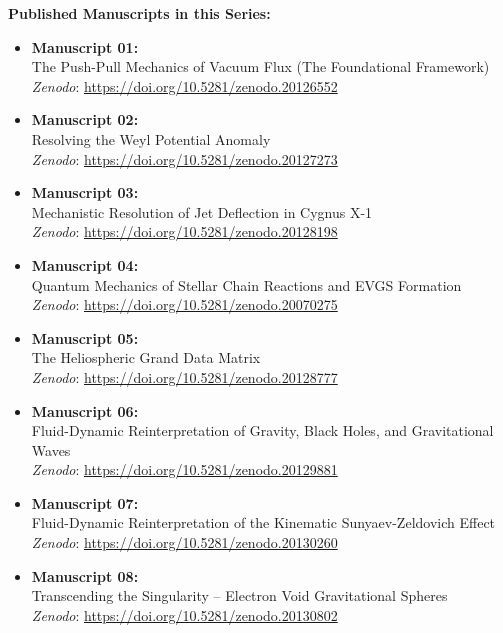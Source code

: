 \documentclass[11pt, a4paper]{article}
\begin{document}
  \vspace{1em}
  \noindent \textbf{Published Manuscripts in this Series:}
  \begin{itemize}
    \item \textbf{Manuscript 01:} \\ The Push-Pull Mechanics of Vacuum Flux (The Foundational Framework) \\ \textit{Zenodo}: \url{https://doi.org/10.5281/zenodo.20126552}
    
    \item \textbf{Manuscript 02:} \\ Resolving the Weyl Potential Anomaly \\ \textit{Zenodo}: \url{https://doi.org/10.5281/zenodo.20127273}

    \item \textbf{Manuscript 03:} \\ Mechanistic Resolution of Jet Deflection in Cygnus X-1 \\ \textit{Zenodo}: \url{https://doi.org/10.5281/zenodo.20128198}

    \item \textbf{Manuscript 04:} \\ Quantum Mechanics of Stellar Chain Reactions and EVGS Formation \\ \textit{Zenodo}: \url{https://doi.org/10.5281/zenodo.20070275}

    \item \textbf{Manuscript 05:} \\ The Heliospheric Grand Data Matrix \\ \textit{Zenodo}: \url{https://doi.org/10.5281/zenodo.20128777}

    \item \textbf{Manuscript 06:} \\ Fluid-Dynamic Reinterpretation of Gravity, Black Holes, and Gravitational Waves \\ \textit{Zenodo}: \url{https://doi.org/10.5281/zenodo.20129881}

    \item \textbf{Manuscript 07:} \\ Fluid-Dynamic Reinterpretation of the Kinematic Sunyaev-Zeldovich Effect \\ \textit{Zenodo}: \url{https://doi.org/10.5281/zenodo.20130260}

    \item \textbf{Manuscript 08:} \\ Transcending the Singularity -- Electron Void Gravitational Spheres \\ \textit{Zenodo}: \url{https://doi.org/10.5281/zenodo.20130802}


\end{itemize}
\end{document}
